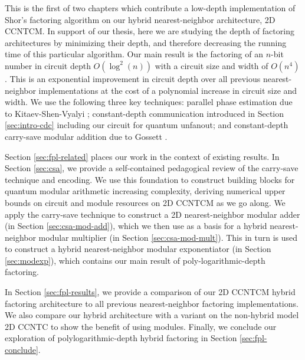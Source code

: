 This is the first of two chapters which contribute a low-depth
implementation of Shor's factoring algorithm on our hybrid nearest-neighbor
architecture, \textsf{2D CCNTCM}. In support of our thesis,
here we are studying the depth of factoring architectures by minimizing
their depth, and therefore decreasing the running time of this
particular algorithm. Our main result is the
factoring of an
$n$-bit number in circuit depth $O(\log^2(n))$
with a circuit size and width of $O(n^4)$.
This is an exponential improvement in circuit depth
over all previous nearest-neighbor implementations
\cite{Beauregard2002,Kutin2006,VanMeter2006,VanMeter2005,VanMeterIL2005}
at the cost of a polynomial increase in circuit size and width.
We use the
following three key techniques:
parallel phase estimation due to Kitaev-Shen-Vyalyi \cite{Kitaev2002};
constant-depth communication introduced in Section \ref{sec:intro-cdc}
including our circuit for quantum unfanout;
and 
constant-depth carry-save modular addition due to Gossett \cite{Gossett1998}.

Section \ref{sec:fpl-related} places our work in the context of existing
results.
In Section \ref{sec:csa}, we provide a self-contained pedagogical review
of the carry-save technique and encoding.
We use this foundation to construct building blocks for quantum modular
arithmetic increasing complexity,
deriving numerical upper bounds on circuit and module resources
on \textsf{2D CCNTCM} as we go along.
We apply the carry-save technique to construct a 2D
nearest-neighbor modular adder (in Section \ref{sec:csa-mod-add}),
which we then use as a basis for a hybrid nearest-neighbor modular multiplier
(in Section \ref{sec:csa-mod-mult}). This in turn is used to
construct a hybrid nearest-neighbor modular exponentiator
(in Section \ref{sec:modexp}), which contains our
main result of poly-logarithmic-depth factoring.


In Section \ref{sec:fpl-results}, we provide a comparison of our \textsf{2D CCNTCM}
hybrid factoring architecture to all previous nearest-neighbor factoring
implementations. We also compare our hybrid architecture with a
variant on the non-hybrid model \textsf{2D CCNTC} to show the
benefit of using modules. Finally, we conclude our exploration
of polylogarithmic-depth hybrid factoring in Section
\ref{sec:fpl-conclude}.